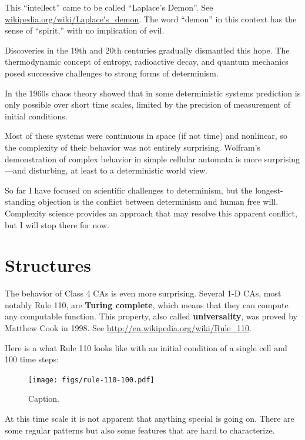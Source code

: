\documentclass[10pt]{book}
\begin{document}
This ``intellect'' came to be called ``Laplace's Demon''.
See \url{wikipedia.org/wiki/Laplace's_demon}.  The word
``demon'' in this context has the sense of ``spirit,'' with no
implication of evil.

Discoveries in the 19th and 20th centuries gradually dismantled
this hope.  The thermodynamic concept of entropy, radioactive decay,
and quantum mechanics posed successive challenges to strong
forms of determinism.

In the 1960s chaos theory showed that in some deterministic systems
prediction is only possible over short time scales,  limited by
the precision of measurement of initial conditions.

Most of these systems were continuous in space (if not time) and
nonlinear, so the complexity of their behavior was not entirely
surprising.  Wolfram's demonstration of complex behavior in simple
cellular automata is more surprising---and disturbing, at least to a
deterministic world view.

So far I have focused on scientific challenges to determinism, but the
longest-standing objection is the conflict between
determinism and human free will.  Complexity science provides
an approach that may resolve this apparent conflict, but I
will stop there for now.


\section{Structures}

The behavior of Class 4 CAs is even more surprising.  Several 1-D CAs,
most notably Rule 110, are {\bf Turing complete}, which means that
they can compute any computable function.  This property, also called
{\bf universality}, was proved by Matthew Cook in 1998.  See
\url{http://en.wikipedia.org/wiki/Rule_110}.

Here is a what Rule 110 looks like with an initial condition of
a single cell and 100 time steps:

\begin{figure}
\centerline{\texttt{[image: figs/rule-110-100.pdf]}}
\caption{Caption.}
\end{figure}

At this time scale it is not apparent that anything special is
going on.  There are some regular patterns but also some features
that are hard to characterize.
\end{document}
